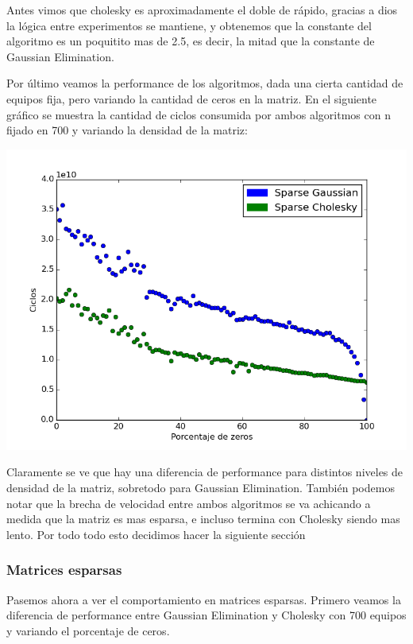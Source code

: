  Antes vimos que cholesky es aproximadamente el doble de rápido, gracias a dios la lógica entre experimentos se mantiene, y obtenemos que la constante del algoritmo es un poquitito mas de 2.5, es decir, la mitad que la constante de Gaussian Elimination.
 
 Por último veamos la performance de los algoritmos, dada una cierta cantidad de equipos fija, pero variando la cantidad de ceros en la matriz. En el siguiente gráfico se muestra la cantidad de ciclos consumida por ambos algoritmos con n fijado en 700 y variando la densidad de la matriz:
 
\includegraphics[scale=0.7]{img/testsparse.png}
 
Claramente se ve que hay una diferencia de performance para distintos niveles de densidad de la matriz, sobretodo para Gaussian Elimination. También podemos notar que la brecha de velocidad entre ambos algoritmos se va achicando a medida que la matriz es mas esparsa, e incluso termina con Cholesky siendo mas lento. Por todo todo esto decidimos hacer la siguiente sección 
 
\subsubsection{Matrices esparsas}

Pasemos ahora a ver el comportamiento en matrices esparsas. Primero veamos la diferencia de performance entre Gaussian Elimination y Cholesky con 700 equipos y variando el porcentaje de ceros.

